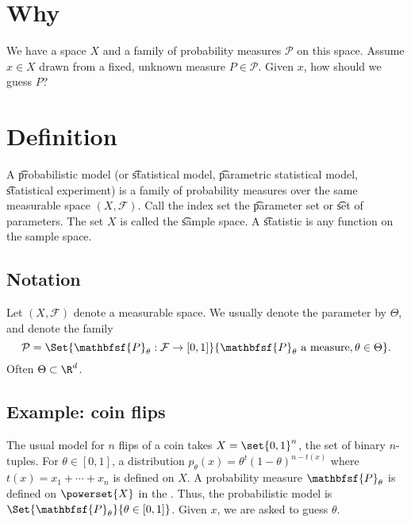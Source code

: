 

\section*{Why}

We have a space $X$ and a family of probability measures $\mathcal{P} $ on this space.
Assume $x \in X$ drawn from a fixed, unknown measure $P \in \mathcal{P} $.
Given $x$, how should we guess $P$?

\section*{Definition}

A \t{probabilistic model} (or \t{statistical model}, \t{parametric statistical model}, \t{statistical experiment}) is a family of probability measures over the same measurable space $(X, \mathcal{F} )$.
Call the index set the \t{parameter set} or \t{set of parameters}.
The set $X$ is called the \t{sample space}.
A \t{statistic} is any function on the sample space.

\subsection*{Notation}

Let $(X, \mathcal{F} )$ denote a measurable space.
We usually denote the parameter by $\Theta $, and denote the family
    \[
\mathcal{P}  = \Set{\mathbfsf{P} _\theta : \mathcal{F}  \to [0,1]}{\mathbfsf{P} _\theta  \text{ a measure}, \theta  \in \Theta }.
    \]
Often $\Theta  \subset \R ^d$.


\subsection*{Example: coin flips}

The usual model for $n$ flips of a coin takes $X = \set{0,1}^n$, the set of binary $n$-tuples.
For $\theta  \in [0, 1]$, a distribution $p_\theta (x) = \theta ^t(1-\theta )^{n-t(x)}$ where $t(x) = x_1 + \cdots + x_n$ is defined on $X$.
A probability measure $\mathbfsf{P} _\theta $ is defined on $\powerset{X}$ in the .
Thus, the probabilistic model is $\Set{\mathbfsf{P} _\theta }{\theta  \in [0,1]}$.
Given $x$, we are asked to guess $\theta $.

